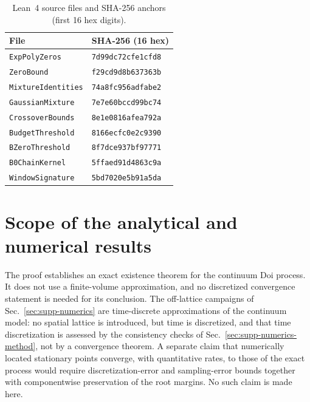 \documentclass[aps,physrev,onecolumn,amsmath,amssymb,longbibliography]{revtex4-2}
\begin{document}
\begin{table}[t]
\caption{Lean~4 source files and SHA-256 anchors (first 16 hex digits).
\label{tab:supp-lean-anchors}}
\begin{ruledtabular}
\begin{tabular}{ll}
File & SHA-256 (16 hex)\\
\hline
\texttt{ExpPolyZeros} & \texttt{7d99dc72cfe1cfd8}\\
\texttt{ZeroBound} & \texttt{f29cd9d8b637363b}\\
\texttt{MixtureIdentities} & \texttt{74a8fc956adfabe2}\\
\texttt{GaussianMixture} & \texttt{7e7e60bccd99bc74}\\
\texttt{CrossoverBounds} & \texttt{8e1e0816afea792a}\\
\texttt{BudgetThreshold} & \texttt{8166ecfc0e2c9390}\\
\texttt{BZeroThreshold} & \texttt{8f7dce937bf97771}\\
\texttt{B0ChainKernel} & \texttt{5ffaed91d4863c9a}\\
\texttt{WindowSignature} & \texttt{5bd7020e5b91a5da}\\
\end{tabular}
\end{ruledtabular}
\end{table}

\section{Scope of the analytical and numerical results}
\label{sec:supp-scope}

The proof establishes an exact existence theorem for the continuum Doi
process.  It does not use a finite-volume approximation, and no discretized
convergence statement is needed for its conclusion.  The off-lattice
campaigns of Sec.~\ref{sec:supp-numerics} are time-discrete approximations of
the continuum model: no spatial lattice is introduced, but time is
discretized, and that time discretization is assessed by the
consistency checks of Sec.~\ref{sec:supp-numerics-method}, not by a
convergence theorem.  A separate claim that numerically located stationary
points converge, with quantitative rates, to those of the exact process
would require discretization-error and sampling-error bounds together with
componentwise preservation of the root margins.  No such claim is made
here.


\end{document}
